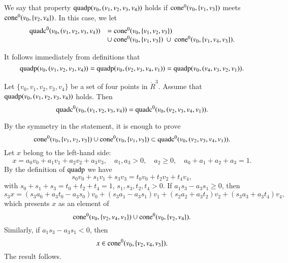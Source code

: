 \begin{tarskidata}
\begin{tarski}
\begin{definition}
We say that property ${\operatorname{quadp}}(v_0,(v_1,v_2,v_3,v_4))$  holds if
${\operatorname{cone}}^0(v_0,\{v_1,v_3\})$ meets ${\operatorname{cone}}^0(v_0,\{v_2,v_4\})$.
In this case, we let 
 $$
  \begin{array}{lll}
   \op{quadc}^0(v_0,(v_1,v_2,v_3,v_4))&= 
    \op{cone}^0(v_0,\{v_1,v_2,v_3\})  \\
    &\cup \ \op{cone}^0(v_0,\{v_1,v_3\})\ \cup \ 
   \op{cone}^0(v_0,\{v_1,v_4,v_3\}).
  \end{array}
  $$
\end{definition}
It follows immediately from definitions that
  $${\operatorname{quadp}}(v_0,(v_1,v_2,v_3,v_4))={\operatorname{quadp}}(v_0,(v_2,v_3,v_4,v_1)) = {\operatorname{quadp}}(v_0,(v_4,v_3,v_2,v_1)).$$
\end{tarski}





\begin{tarski}
\tag{pt5, quadp, quadc, cone}

\begin{lemma}
Let $\{v_0,v_1,v_2,v_3,v_4\}$ be a set of four points in $\ring{R}^3$.
Assume that ${\operatorname{quadp}}(v_0,(v_1,v_2,v_3,v_4))$ holds.
Then 
 $${\operatorname{quadc}}^0(v_0,(v_1,v_2,v_3,v_4))  
  = {\operatorname{quadc}}^0(v_0,(v_2,v_3,v_4,v_1)).
 $$
\end{lemma}

\begin{proved}
By the symmetry in the statement, it is enough to prove 
  $${\operatorname{cone}}^0(v_0,\{v_1,v_2,v_3\})\cup{\operatorname{cone}}^0(v_0,\{v_1,v_3\})
  \subset {\operatorname{quadc}}^0(v_0,(v_2,v_3,v_4,v_1)).$$
Let $x$ belong to the left-hand side:
  $$
  x = a_0 v_0 + a_1 v_1 + a_2 v_2 + a_3 v_3,
  \quad a_1,a_3 > 0,\quad a_2\ge 0,\quad a_0+a_1+a_2+a_3=1.
  $$
By the definition of ${\operatorname{quadp}}$ we have
$$
  s_0 v_0 + s_1 v_1 + s_3 v_3 = t_0 v_0 + t_2 v_2 + t_4 v_4,
$$
with $s_0 + s_1 + s_3 = t_0 + t_2 + t_4 = 1$, $s_1,s_3,t_2,t_4>0$.
If $a_1 s_3 - a_3 s_1 \ge 0$, then
  $$s_3 x = (s_3 a_0 + a_3 t_0 - a_3 s_0) v_0 + 
          (s_3 a_1 - a_3 s_1) v_1 + (s_2 a_2 + a_3 t_2) v_2 +
          (s_3 a_3 + a_3 t_4) v_4,$$
which presents $x$ as an element of 
 $$
 {\operatorname{cone}}^0(v_0,\{v_2,v_4,v_1\}) \cup{\operatorname{cone}}^0(v_0,\{v_2,v_4\}).
 $$
Similarly, if $a_1 s_3 - a_3 s_1 < 0$, then
  $$
  x\in {\operatorname{cone}}^0(v_0,\{v_2,v_4,v_3\}).
  $$
The result follows.
\swallowed\end{proved}
\end{tarski}







\end{tarskidata}
